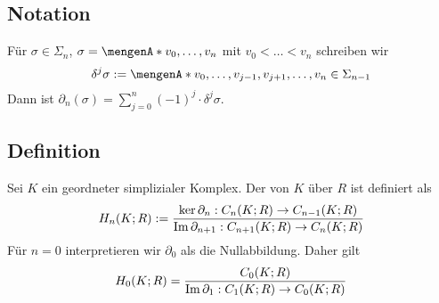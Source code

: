 \subsection[Notation für das Weglassen eines Knotens]{Notation} %
\label{sub:39}
Für $\sigma \in \Sigma_n$, $ \sigma= \set{v_0, \ldots ,v_n} $ mit $v_0 < \ldots < v_n$ schreiben wir 
\[
	\delta^j \sigma := \set{v_0 , \ldots , v_{j-1}, v_{j+1}, \ldots , v_n}  \in \Sigma_{n-1}
\]
Dann ist $\partial_n(\sigma) = \sum_{j=0}^{n} (-1)^j \cdot \delta^j \sigma$.

\subsection[Definition: $n$-ter Homologiemodul]{Definition} %
\label{sub:310}
Sei $K$ ein geordneter simplizialer Komplex. Der  von $K$ über $R$ ist 
definiert als
\[
	H_n(K;R) := \frac{\ker \partial_n : C_n(K;R) \to C_{n-1}(K;R)}{\operatorname{Im} \partial_{n+1} : C_{n+1}(K;R) \to C_n(K;R)} 
\]
Für $n=0$ interpretieren wir $\partial_0$ als die Nullabbildung. Daher gilt 
\[
	H_0(K;R) = \frac{C_0(K;R)}{\operatorname{Im} \partial_1 : C_1(K;R) \to C_0(K;R)} 
\]

